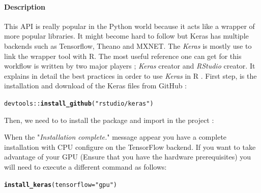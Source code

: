 \documentclass[6pt,letter]{article}\usepackage[]{graphicx}\usepackage[]{color}
\makeatletter
\newcommand{\hlstr}[1]{\textcolor[rgb]{0.192,0.494,0.8}{#1}}%
\newcommand{\hlopt}[1]{\textcolor[rgb]{0,0,0}{#1}}%
\newcommand{\hlstd}[1]{\textcolor[rgb]{0.345,0.345,0.345}{#1}}%
\newcommand{\hlkwc}[1]{\textcolor[rgb]{0.333,0.667,0.333}{#1}}%
\newcommand{\hlkwd}[1]{\textcolor[rgb]{0.737,0.353,0.396}{\textbf{#1}}}%
\newenvironment{kframe}{%
 \def\at@end@of@kframe{}%
 \ifinner\ifhmode%
  \def\at@end@of@kframe{\end{minipage}}%
  \begin{minipage}{\columnwidth}%
 \fi\fi%
 \def\FrameCommand##1{\hskip\@totalleftmargin \hskip-\fboxsep
 \colorbox{shadecolor}{##1}\hskip-\fboxsep
     \hskip-\linewidth \hskip-\@totalleftmargin \hskip\columnwidth}%
 \MakeFramed {\advance\hsize-\width
   \@totalleftmargin\z@ \linewidth\hsize
   \@setminipage}}%
 {\par\unskip\endMakeFramed%
 \at@end@of@kframe}
\newenvironment{knitrout}{}{} %
\makeatother
\begin{document}
\paragraph{Description}
This API is really popular in the Python world because it acts like a wrapper of more popular libraries. It might become hard to follow but Keras has multiple backends such as Tensorflow, Theano and MXNET. The \textit{Keras} \cite{keras2019} is mostly use to link the wrapper tool with R. The most useful reference one can get for this workflow is written by two major players ; \textit{Keras} creator and \textit{RStudio} creator. It explains in detail the best practices in order to use \textit{Keras} in R \cite{chollet2018deep}.
First step, is the installation and download of the Keras files from GitHub :
\begin{knitrout}
\color{fgcolor}\begin{kframe}
\begin{alltt}
\hlstd{devtools}\hlopt{::}\hlkwd{install_github}\hlstd{(}\hlstr{"rstudio/keras"}\hlstd{)}
\end{alltt}
\end{kframe}
\end{knitrout}
Then, we need to to install the package and import in the project :
\begin{knitrout}
\color{fgcolor}\begin{kframe}


{\ttfamily\noindent\bfseries\color{errorcolor}{\#\# Error in install\_keras(): You should call install\_keras() only in a fresh R session that has not yet initialized Keras and TensorFlow (this is to avoid DLL in use errors during installation)}}\end{kframe}
\end{knitrout}
When the "\textit{Installation complete.}" message appear you have a complete installation with CPU configure on the TensorFlow backend.
If you want to take advantage of your GPU (Ensure that you have the hardware prerequisites) you will need to execute a different command as follows:
\begin{knitrout}
\color{fgcolor}\begin{kframe}
\begin{alltt}
\hlkwd{install_keras}\hlstd{(}\hlkwc{tensorflow} \hlstd{=} \hlstr{"gpu"}\hlstd{)}
\end{alltt}
\end{kframe}
\end{knitrout}
\end{document}
